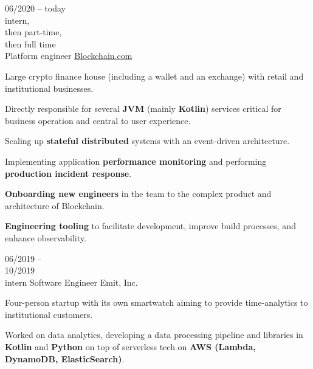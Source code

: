 \begin{entrylist}
    \entry
    {
        06/2020 -- today\\\footnotesize{intern,\\then part-time, \\then full time}\\
    }
    {Platform engineer}
    {\href{https://blockchain.com/about}{Blockchain.com}}
    {
        Large crypto finance house (including a wallet and an exchange) with retail and
    institutional businesses.

    \para
    Directly responsible for several \textbf{JVM} (mainly \textbf{Kotlin}) services critical for business operation and central to user experience.

    \para
    Scaling up \textbf{stateful distributed} systems with an event-driven architecture.

    \para
    Implementing application \textbf{performance monitoring} and performing \textbf{production incident response}.

    \para
    \textbf{Onboarding new engineers} in the team to the complex product and architecture of Blockchain.

    \para
    \textbf{Engineering tooling} to facilitate development, improve build processes, and enhance observability.
    }
    \entry
    {06/2019 -- \\ 10/2019\\\footnotesize{intern}}
    {Software Engineer}
    {Emit, Inc.}
    {
        Four-person startup with its own smartwatch aiming to provide time-analytics to
        institutional customers.

        \para
        Worked on data analytics, developing a data processing pipeline and libraries in
    \textbf{Kotlin} and \textbf{Python} on top of serverless tech on \textbf{AWS (Lambda,
        DynamoDB, ElasticSearch)}.
    }
\end{entrylist}
